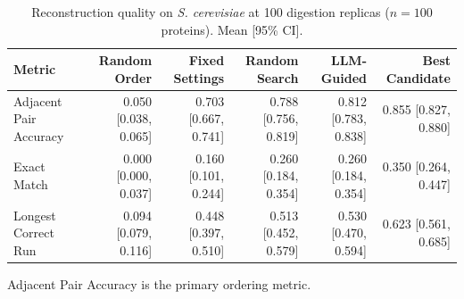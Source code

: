 \begin{table}[!t]
  \centering
  \caption{Reconstruction quality on \textit{S. cerevisiae} at 100 digestion replicas ($n=100$ proteins). Mean [95\% CI].}
  \label{tab:main_results_yeast}
  \begin{tabular}{lrrrrr}
    \toprule
    Metric & Random Order & Fixed Settings & Random Search & LLM-Guided & Best Candidate \\
    \midrule
    Adjacent Pair Accuracy & 0.050 [0.038, 0.065] & 0.703 [0.667, 0.741] & 0.788 [0.756, 0.819] & 0.812 [0.783, 0.838] & 0.855 [0.827, 0.880] \\
    Exact Match & 0.000 [0.000, 0.037] & 0.160 [0.101, 0.244] & 0.260 [0.184, 0.354] & 0.260 [0.184, 0.354] & 0.350 [0.264, 0.447] \\
    Longest Correct Run & 0.094 [0.079, 0.116] & 0.448 [0.397, 0.510] & 0.513 [0.452, 0.579] & 0.530 [0.470, 0.594] & 0.623 [0.561, 0.685] \\
    \bottomrule
  \end{tabular}
  \par\smallskip\footnotesize{Adjacent Pair Accuracy is the primary ordering metric.}
\end{table}
